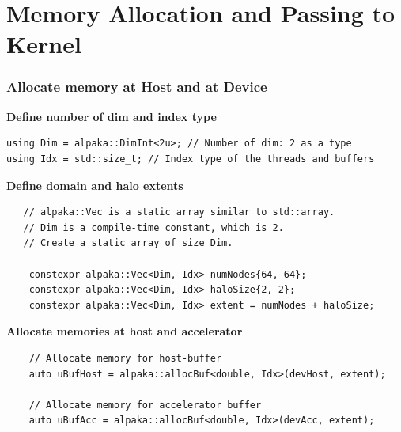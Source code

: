 \documentclass[9pt]{beamer}
\begin{document}

\section{Memory Allocation and Passing to Kernel}


 \begin{frame}[fragile]
\frametitle{Allocate memory at Host and at Device}

\textbf{Define number of dim and index type}
\begin{lstlisting}
using Dim = alpaka::DimInt<2u>; // Number of dim: 2 as a type
using Idx = std::size_t; // Index type of the threads and buffers
 \end{lstlisting}

\textbf{Define domain and halo extents}
\begin{lstlisting}
   // alpaka::Vec is a static array similar to std::array.
   // Dim is a compile-time constant, which is 2.
   // Create a static array of size Dim.

    constexpr alpaka::Vec<Dim, Idx> numNodes{64, 64};
    constexpr alpaka::Vec<Dim, Idx> haloSize{2, 2};
    constexpr alpaka::Vec<Dim, Idx> extent = numNodes + haloSize;
\end{lstlisting}

\textbf{Allocate memories at host and accelerator}
\begin{lstlisting}
    // Allocate memory for host-buffer
    auto uBufHost = alpaka::allocBuf<double, Idx>(devHost, extent);

    // Allocate memory for accelerator buffer
    auto uBufAcc = alpaka::allocBuf<double, Idx>(devAcc, extent);
\end{lstlisting}
\end{frame}
\end{document}

